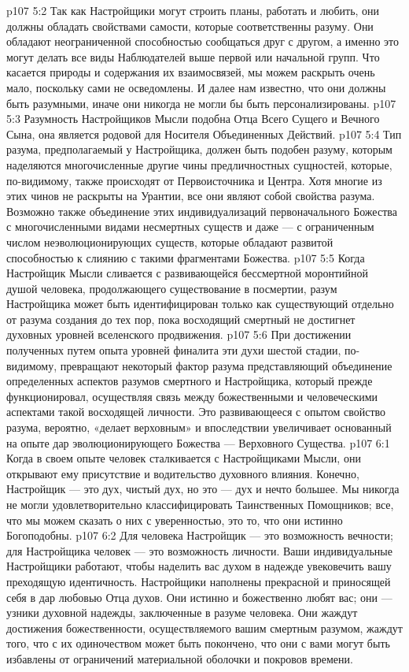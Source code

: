 \vs p107 5:2 Так как Настройщики могут строить планы, работать и любить, они должны обладать свойствами самости, которые соответственны разуму. Они обладают неограниченной способностью сообщаться друг с другом, а именно это могут делать все виды Наблюдателей выше первой или начальной групп. Что касается природы и содержания их взаимосвязей, мы можем раскрыть очень мало, поскольку сами не осведомлены. И далее нам известно, что они должны быть разумными, иначе они никогда не могли бы быть персонализированы.
\vs p107 5:3 Разумность Настройщиков Мысли подобна  Отца Всего Сущего и Вечного Сына, она является родовой для  Носителя Объединенных Действий.
\vs p107 5:4 Тип разума, предполагаемый у Настройщика, должен быть подобен разуму, которым наделяются многочисленные другие чины предличностных сущностей, которые, по\hyp{}видимому, также происходят от Первоисточника и Центра. Хотя многие из этих чинов не раскрыты на Урантии, все они являют собой свойства разума. Возможно также объединение этих индивидуализаций первоначального Божества с многочисленными видами несмертных существ и даже --- с ограниченным числом неэволюционирующих существ, которые обладают развитой способностью к слиянию с такими фрагментами Божества.
\vs p107 5:5 Когда Настройщик Мысли сливается с развивающейся бессмертной моронтийной душой человека, продолжающего существование в посмертии, разум Настройщика может быть идентифицирован только как существующий отдельно от разума создания до тех пор, пока восходящий смертный не достигнет духовных уровней вселенского продвижения.
\vs p107 5:6 При достижении полученных путем опыта уровней финалита эти духи шестой стадии, по\hyp{}видимому, превращают некоторый фактор разума представляющий объединение определенных аспектов разумов смертного и Настройщика, который прежде функционировал, осуществляя связь между божественными и человеческими аспектами такой восходящей личности. Это развивающееся с опытом свойство разума, вероятно, «делает верховным» и впоследствии увеличивает основанный на опыте дар эволюционирующего Божества --- Верховного Существа.
\vs p107 6:1 Когда в своем опыте человек сталкивается с Настройщиками Мысли, они открывают ему присутствие и водительство духовного влияния. Конечно, Настройщик --- это дух, чистый дух, но это --- дух и нечто большее. Мы никогда не могли удовлетворительно классифицировать Таинственных Помощников; все, что мы можем сказать о них с уверенностью, это то, что они истинно Богоподобны.
\vs p107 6:2 Для человека Настройщик --- это возможность вечности; для Настройщика человек --- это возможность личности. Ваши индивидуальные Настройщики работают, чтобы наделить вас духом в надежде увековечить вашу преходящую идентичность. Настройщики наполнены прекрасной и приносящей себя в дар любовью Отца духов. Они истинно и божественно любят вас; они --- узники духовной надежды, заключенные в разуме человека. Они жаждут достижения божественности, осуществляемого вашим смертным разумом, жаждут того, что с их одиночеством может быть покончено, что они с вами могут быть избавлены от ограничений материальной оболочки и покровов времени.
